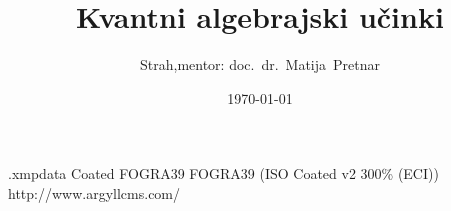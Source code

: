 \begin{filecontents*}[overwrite]{\jobname.xmpdata}
                     {Coated FOGRA39}
                     {FOGRA39 (ISO Coated v2 300\% (ECI))}
                     {http://www.argyllcms.com/}
\end{filecontents*}
\documentclass[a4paper,slovene]{article}
\usepackage[slovene]{babel}

\title{Kvantni algebrajski učinki}
\author{Strah,\quad mentor: doc.~dr.~Matija~Pretnar}
\date{\today}







\maketitle

\begin{abstract}

    Kvantno računalništvo temelji na veliko modernih konceptih v teoriji programskih jezikov,
    kot na primer linearnost tipov, (kvantnimi) fizikalnimi pojavi, in še mnogo drugimi.
    V diplomski nalogi se bomo posvetili tema dvema, v tem članku pa zgolj drugemu.
    Naš cilj je razumeti, kako se kvantni programi obnašajo,
    in dober način je razumevanje enakosti programov.


\end{abstract}


